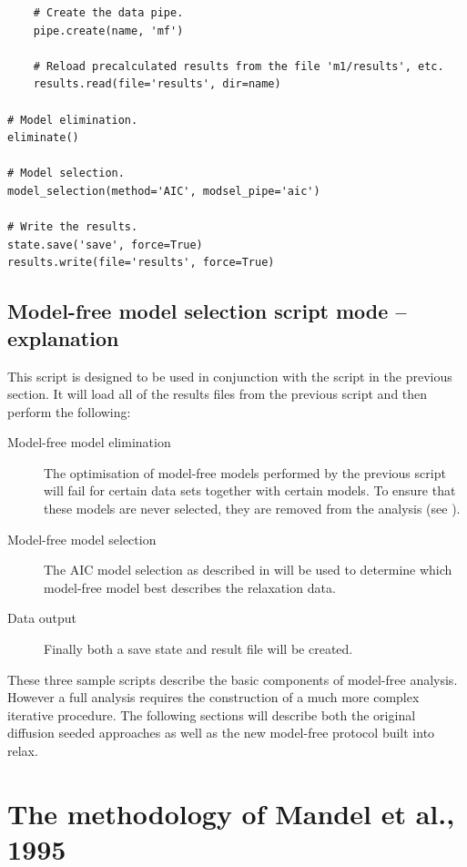 \begin{htmlonly}
\begin{htmlonly}
\begin{lstlisting}
    # Create the data pipe.
    pipe.create(name, 'mf')
    
    # Reload precalculated results from the file 'm1/results', etc.
    results.read(file='results', dir=name)

# Model elimination.
eliminate()

# Model selection.
model_selection(method='AIC', modsel_pipe='aic')

# Write the results.
state.save('save', force=True)
results.write(file='results', force=True)
\end{lstlisting}



\subsection{Model-free model selection script mode -- explanation}

This script is designed to be used in conjunction with the  script in the previous section.  It will load all of the results files from the previous script and then perform the following:

\begin{description}
\item[Model-free model elimination]  The optimisation of model-free models performed by the previous script will fail for certain data sets together with certain models.  To ensure that these models are never selected, they are removed from the analysis (see \citet{dAuvergneGooley06}).
\item[Model-free model selection]  The AIC model selection as described in \citet{dAuvergneGooley03} will be used to determine which model-free model best describes the relaxation data.
\item[Data output]  Finally both a save state and result file will be created.
\end{description}

These three sample scripts describe the basic components of model-free analysis.  However a full analysis requires the construction of a much more complex iterative procedure.  The following sections will describe both the original diffusion seeded approaches as well as the new model-free protocol built into relax.



\section{The methodology of Mandel et al., 1995}
\label{sect: Mandel 1995}


\end{htmlonly}
\end{htmlonly}

